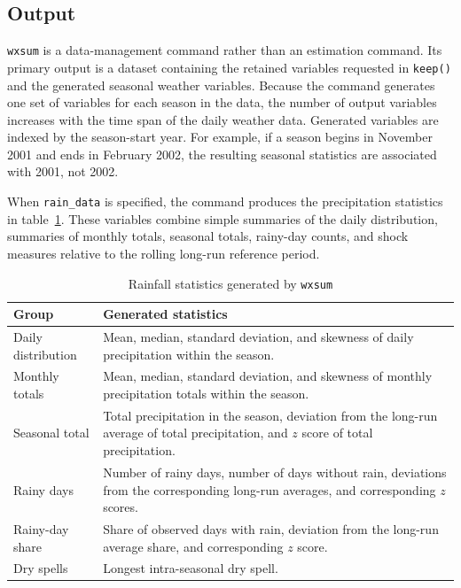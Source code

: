 \subsection{Output}

\texttt{wxsum} is a data-management command rather than an estimation command. Its primary output is a dataset containing the retained variables requested in \texttt{keep()} and the generated seasonal weather variables. Because the command generates one set of variables for each season in the data, the number of output variables increases with the time span of the daily weather data. Generated variables are indexed by the season-start year. For example, if a season begins in November 2001 and ends in February 2002, the resulting seasonal statistics are associated with 2001, not 2002.

When \texttt{rain\_data} is specified, the command produces the precipitation statistics in table~\ref{tab:rainout}. These variables combine simple summaries of the daily distribution, summaries of monthly totals, seasonal totals, rainy-day counts, and shock measures relative to the rolling long-run reference period.

\begin{table}[htbp]
\caption{Rainfall statistics generated by \texttt{wxsum}}
\label{tab:rainout}
\begin{center}
\begin{tabularx}{\textwidth}{lX}
\hline
Group & Generated statistics \\
\hline
Daily distribution & Mean, median, standard deviation, and skewness of daily precipitation within the season. \\
Monthly totals & Mean, median, standard deviation, and skewness of monthly precipitation totals within the season. \\
Seasonal total & Total precipitation in the season, deviation from the long-run average of total precipitation, and $z$ score of total precipitation. \\
Rainy days & Number of rainy days, number of days without rain, deviations from the corresponding long-run averages, and corresponding $z$ scores. \\
Rainy-day share & Share of observed days with rain, deviation from the long-run average share, and corresponding $z$ score. \\
Dry spells & Longest intra-seasonal dry spell. \\
\hline
\end{tabularx}
\end{center}
\end{table}

